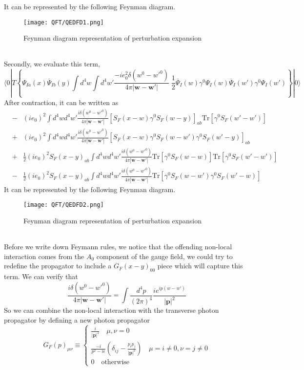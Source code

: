 It can be represented by the following Feynman diagram.
\begin{figure}[!h]
\centering
\texttt{[image: QFT/QEDFD1.png]}
\caption{Feynman diagram representation of perturbation expansion}
\end{figure}\\
Secondly, we evaluate this term,
\[\langle 0 | T \left\{ \Psi_{Ia}(x) \overline{\Psi}_{Ib}(y) \int d^4w \int d^4w' \frac{-ie_0^2\delta(w^0-w'^0)}{4\pi|\bm{w}-\bm{w}'|}\; \frac{1}{2} \overline{\Psi}_I(w)\gamma^0 \Psi_I(w) \overline{\Psi}_I(w')\gamma^0 \Psi_I(w') \right\} | 0 \rangle\]
After contraction, it can be written as
\begin{eqnarray}
&-&  (ie_0)^2 \int d^4w d^4w' \frac{i\delta(w^0-w'^0)}{4\pi|\bm{w}-\bm{w}'|} [S_F(x-w)\gamma^0 S_F(w-y)]_{ab} \mathrm{Tr}[\gamma^0 S_F(w'-w')] \nonumber \\
&+&  (ie_0)^2 \int d^4w d^4w' \frac{i\delta(w^0-w'^0)}{4\pi|\bm{w}-\bm{w}'|} [S_F(x-w)\gamma^0 S_F(w-w') \gamma^0 S_F(w'-y)]_{ab} \nonumber \\
&+& \frac{1}{2} (ie_0)^2 S_F(x-y)_{ab} \int d^4w d^4w' \frac{i\delta(w^0-w'^0)}{4\pi|\bm{w}-\bm{w}'|} \mathrm{Tr}[\gamma^0 S_F(w-w)] \mathrm{Tr}[\gamma^0 S_F(w'-w')] \nonumber \\
&-& \frac{1}{2} (ie_0)^2 S_F(x-y)_{ab} \int d^4w d^4w' \frac{i\delta(w^0-w'^0)}{4\pi|\bm{w}-\bm{w}'|} \mathrm{Tr}[\gamma^0 S_F(w-w')\gamma^0 S_F(w'-w)] \nonumber
\end{eqnarray}
It can be represented by the following Feynman diagram.
\begin{figure}[!h]
\centering
\texttt{[image: QFT/QEDFD2.png]}
\caption{Feynman diagram representation of perturbation expansion}
\end{figure}\\
Before we write down Feymann rules, we notice that the offending non-local interaction comes from the $A_0$ component of the gauge field, we could try to redefine the propagator to include a $G_F(x-y)_{00}$ piece which will capture this term. We can verify that
\[\frac{i\delta(w^0-w'^0)}{4\pi|\bm{w}-\bm{w}'|} = \int \frac{d^4p}{(2\pi)^4} \frac{ie^{ip(w-w')}}{|\bm{p}|^2}\]
So we can combine the non-local interaction with the transverse photon propagator by defining a new photon propagator
\[G_F(p)_{\mu\nu} \equiv \begin{cases} \frac{i}{|\bm{p}|^2} \quad \mu,\nu=0\\  \frac{-i}{p^2-i\epsilon} \left(\delta_{ij} - \frac{p_ip_j}{|\bm{p}|^2}\right) \quad \mu = i \neq 0, \nu = j \neq 0 \\ 0 \quad \mbox{otherwise} \end{cases} \]
